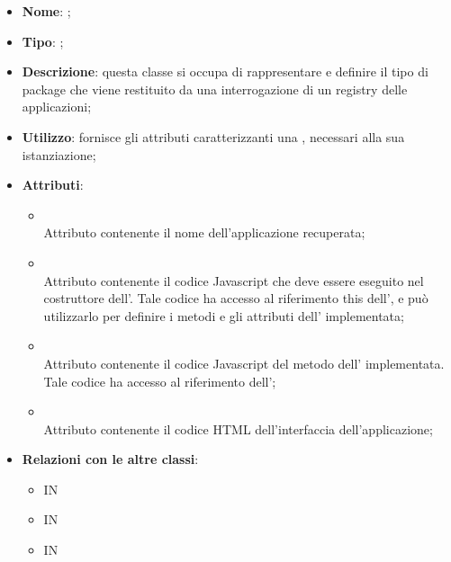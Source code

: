 \begin{itemize}
	\item \textbf{Nome}: ;
	\item \textbf{Tipo}: ;
	\item \textbf{Descrizione}: questa classe si occupa di rappresentare e definire il tipo di package che viene restituito da una interrogazione di un registry delle applicazioni;
	\item \textbf{Utilizzo}: fornisce gli attributi caratterizzanti una , necessari alla sua istanziazione;
	\item \textbf{Attributi}:
	\begin{itemize}
		\item[]  \\
		Attributo contenente il nome dell'applicazione recuperata;
		\item[]  \\
		Attributo contenente il codice Javascript che deve essere eseguito nel costruttore dell'. Tale codice ha accesso al riferimento this dell', e può utilizzarlo per definire i metodi e gli attributi dell' implementata;
		\item[]  \\
		Attributo contenente il codice Javascript del metodo  dell' implementata. Tale codice ha accesso al riferimento  dell';
		\item[]  \\
		Attributo contenente il codice HTML dell'interfaccia dell'applicazione;
	\end{itemize}
	\item \textbf{Relazioni con le altre classi}:
	\begin{itemize}
		\item IN \hyperlink{Application_label}{}
		\item IN \hyperlink{<<interface>> ApplicationRegistryClient_label}{}
		\item IN \hyperlink{ApplicationLocalRegistry_label}{}
	\end{itemize}
\end{itemize}
\FloatBarrier

